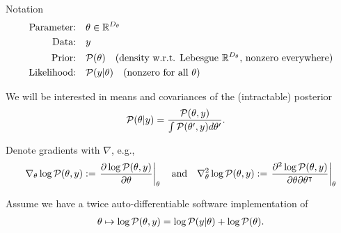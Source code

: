 \documentclass[8pt]{beamer}\usepackage[]{graphicx}\usepackage[]{color}
\begin{document}
\begin{frame}[t]{Notation}
%
%
\begin{align*}
    \text{Parameter:}& \quad \theta \in \mathbb{R}^{{D_{\theta}}}\\
    \text{Data:}&\quad y \\
    \text{Prior:}&\quad \mathcal{P}(\theta) 
        \quad \text{(density w.r.t. Lebesgue $\mathbb{R}^{D_{\theta}}$, 
            nonzero everywhere)}\\
    \text{Likelihood:}&\quad\mathcal{P}(y \vert \theta)
    \quad \text{(nonzero for all $\theta$)}\\
\end{align*}

\pause
We will be interested in means and covariances of the (intractable) posterior
%
\begin{align*}
%
\post ={}& \frac{\p(\theta, \y)}{\int \p(\theta', \y) d\theta'}.
%
\end{align*}
%


\pause
Denote gradients with $\nabla$, e.g.,
%
\begin{align*}
%
\logjointgrad := \fracat{\partial \logjoint}{\partial \theta}{\theta}
\quad\text{and}\quad
\logjointhess := \fracat{\partial^2 \logjoint}
    {\partial \theta \partial \theta^\trans}{\theta}
%
\end{align*}
%

\pause
Assume we have a twice auto-differentiable software implementation of
%
\begin{align*}
    \theta \mapsto \log \mathcal{P}(\theta, y) = \log \mathcal{P}(y \vert \theta) + \log \mathcal{P}(\theta).
\end{align*}


\end{frame}

\end{document}

